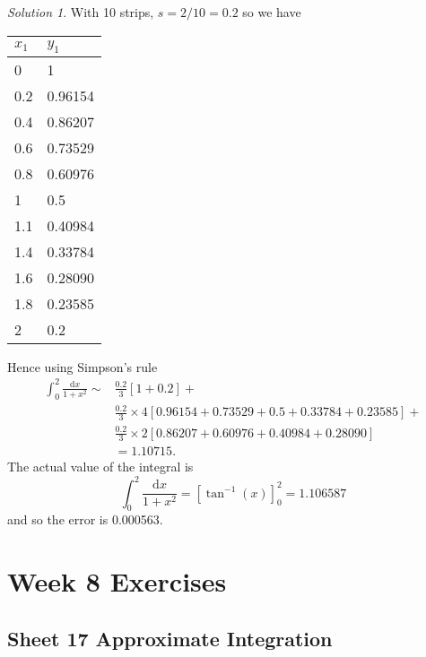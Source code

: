 \documentclass[
  english,
  11pt,
  oneside]{book}
\newcommand{\slide}{}
\theoremstyle{definition}
\theoremstyle{definition}
\theoremstyle{definition}
\theoremstyle{definition}
\theoremstyle{remark}
\newtheorem*{solution}{Solution}
\begin{document}
\begin{solution}
With 10 strips, \(s=2/10=0.2\) so we have

\begin{tabular}{l|l}
\hline
$x_1$ & $y_1$\\
\hline
0 & 1\\
\hline
0.2 & 0.96154\\
\hline
0.4 & 0.86207\\
\hline
0.6 & 0.73529\\
\hline
0.8 & 0.60976\\
\hline
1 & 0.5\\
\hline
1.1 & 0.40984\\
\hline
1.4 & 0.33784\\
\hline
1.6 & 0.28090\\
\hline
1.8 & 0.23585\\
\hline
2 & 0.2\\
\hline
\end{tabular}

Hence using Simpson's rule
\begin{align*}
\int_0^2\frac{\mathrm{d}x}{1+x^2} \sim& \frac{0.2}3\left[1 + 0.2\right] +\\
&\frac{0.2}3\times 4\left[0.96154+0.73529+0.5+0.33784+0.23585\right]+\\
&\frac{0.2}3\times 2\left[0.86207+0.60976+0.40984+0.28090\right]\\
&= 1.10715.
\end{align*}
The actual value of the integral is
\[
\int_0^2\frac{\mathrm{d}x}{1+x^2} = \left[\tan^{-1}(x)\right]_0^2 = 1.106587
\]
and so the error is 0.000563.
\end{solution}

\begin{slidesonly}

\hbox{}
\slide
\hbox{}
\slide
\hbox{}
\slide

\end{slidesonly}

\chapter*{Week 8 Exercises}\label{week-8-exercises}

\section{Sheet 17 Approximate Integration}\label{sheet-17-approximate-integration}
\end{document}
